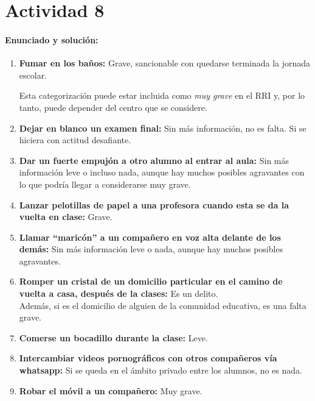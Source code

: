 {\newpage
\section*{Actividad 8}
\paragraph{Enunciado y solución:}

\begin{enumerate}
	\item \textbf{Fumar en los baños: } Grave, sancionable con quedarse terminada la jornada escolar.

	\subitem Esta categorización puede estar incluida como \textit{muy grave} en el RRI y, por lo tanto, puede depender del centro que se considere.

	\item \textbf{Dejar en blanco un examen final: } Sin más información, no es falta.
 Si se hiciera con actitud desafiante.

	\item \textbf{Dar un fuerte empujón a otro alumno al entrar al aula: } Sin más información leve o incluso nada, aunque hay muchos posibles agravantes con lo que podría llegar a considerarse muy grave.

	\item \textbf{Lanzar pelotillas de papel a una profesora cuando esta se da la vuelta en clase: } Grave.

	\item \textbf{Llamar “maricón” a un compañero en voz alta delante de los demás: } Sin más información leve o nada, aunque hay muchos posibles agravantes.

	\item \textbf{Romper un cristal de un domicilio particular en el camino de vuelta a casa, después de la clases: } Es un delito.\\
 Además, si es el domicilio de alguien de la comunidad educativa, es una falta grave.
 
	\item \textbf{Comerse un bocadillo durante la clase: } Leve.

	\item \textbf{Intercambiar videos pornográficos con otros compañeros vía whatsapp: } Si se queda en el ámbito privado entre los alumnos, no es nada.

	\item \textbf{Robar el móvil a un compañero: } Muy grave.


\end{enumerate}}
